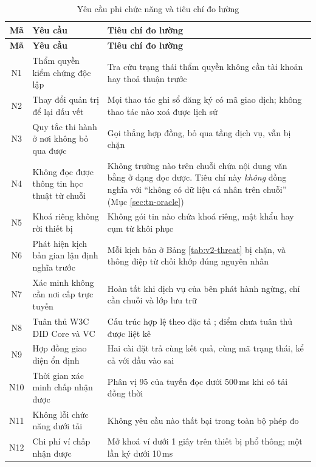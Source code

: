 \begin{longtable}{|c|p{4.4cm}|p{8.6cm}|}
\caption{Yêu cầu phi chức năng và tiêu chí đo lường}
\label{tab:v2-nonfunc} \\
\hline
\textbf{Mã} & \textbf{Yêu cầu} & \textbf{Tiêu chí đo lường} \\ \hline
\endfirsthead
\hline
\textbf{Mã} & \textbf{Yêu cầu} & \textbf{Tiêu chí đo lường} \\ \hline
\endhead
N1 & Thẩm quyền kiểm chứng độc lập & Tra cứu trạng thái thẩm quyền không cần tài khoản hay thoả thuận trước \\ \hline
N2 & Thay đổi quản trị để lại dấu vết & Mọi thao tác ghi sổ đăng ký có mã giao dịch; không thao tác nào xoá được lịch sử \\ \hline
N3 & Quy tắc thi hành ở nơi không bỏ qua được & Gọi thẳng hợp đồng, bỏ qua tầng dịch vụ, vẫn bị chặn \\ \hline
N4 & Không đọc được thông tin học thuật từ chuỗi & Không trường nào trên chuỗi chứa nội dung văn bằng ở dạng đọc được. Tiêu chí này \emph{không} đồng nghĩa với ``không có dữ liệu cá nhân trên chuỗi'' (Mục \ref{sec:tn-oracle}) \\ \hline
N5 & Khoá riêng không rời thiết bị & Không gói tin nào chứa khoá riêng, mật khẩu hay cụm từ khôi phục \\ \hline
N6 & Phát hiện kịch bản gian lận định nghĩa trước & Mỗi kịch bản ở Bảng \ref{tab:v2-threat} bị chặn, và thông điệp từ chối khớp đúng nguyên nhân \\ \hline
N7 & Xác minh không cần nơi cấp trực tuyến & Hoàn tất khi dịch vụ của bên phát hành ngừng, chỉ cần chuỗi và lớp lưu trữ \\ \hline
N8 & Tuân thủ W3C DID Core và VC & Cấu trúc hợp lệ theo đặc tả \cite{W3C_DIDCore2022, W3C_VCDM2025}; điểm chưa tuân thủ được liệt kê \\ \hline
N9 & Hợp đồng giao diện ổn định & Hai cài đặt trả cùng kết quả, cùng mã trạng thái, kể cả với đầu vào sai \\ \hline
N10 & Thời gian xác minh chấp nhận được & Phân vị 95 của tuyến đọc dưới 500\,ms khi có tải đồng thời \\ \hline
N11 & Không lỗi chức năng dưới tải & Không yêu cầu nào thất bại trong toàn bộ phép đo \\ \hline
N12 & Chi phí ví chấp nhận được & Mở khoá ví dưới 1 giây trên thiết bị phổ thông; một lần ký dưới 10\,ms \\ \hline
\end{longtable}
